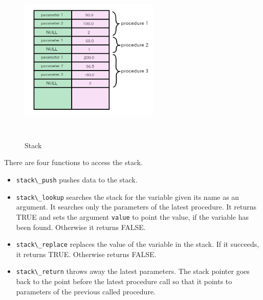 \begin{figure}
\centering
\includegraphics[width=6.64cm,height=8.05cm]{../image/stack.png}
\caption{Stack}
\end{figure}

There are four functions to access the stack.

\begin{itemize}
\tightlist
\item
  \passthrough{\lstinline!stack\_push!} pushes data to the stack.
\item
  \passthrough{\lstinline!stack\_lookup!} searches the stack for the
  variable given its name as an argument. It searches only the
  parameters of the latest procedure. It returns TRUE and sets the
  argument \passthrough{\lstinline!value!} to point the value, if the
  variable has been found. Otherwise it returns FALSE.
\item
  \passthrough{\lstinline!stack\_replace!} replaces the value of the
  variable in the stack. If it succeeds, it returns TRUE. Otherwise
  returns FALSE.
\item
  \passthrough{\lstinline!stack\_return!} throws away the latest
  parameters. The stack pointer goes back to the point before the latest
  procedure call so that it points to parameters of the previous called
  procedure.
\end{itemize}

